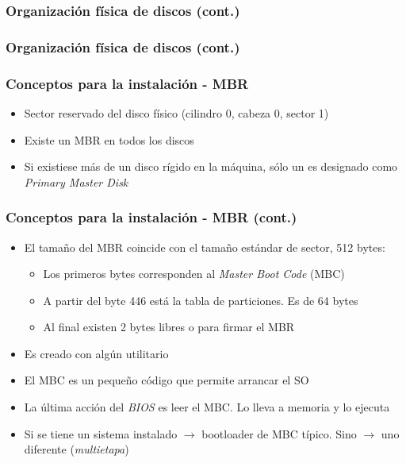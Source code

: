 \begin{frame}
	\frametitle{Organización física de discos (cont.)}
	\begin{figure}
	\end{figure}
\end{frame}

\begin{frame}
	\frametitle{Organización física de discos (cont.)}
	\begin{figure}
	\end{figure}
\end{frame}

\begin{frame}
	\frametitle{Conceptos para la instalación - \textbf{MBR}}
	\begin{itemize}
		\item Sector reservado del disco físico (cilindro 0, cabeza 0, sector 1)
		\item Existe un MBR en todos los discos
		\item Si existiese más de un disco rígido en la máquina, sólo un es designado como \textit{Primary Master Disk}
	\end{itemize}
\end{frame}

\begin{frame}
	\frametitle{Conceptos para la instalación - MBR (cont.)}
	\begin{itemize}
		\item El tamaño del MBR coincide con el tamaño estándar de sector, 512 bytes:
		\begin{itemize}
			\item Los primeros bytes corresponden al \textit{Master Boot Code} (MBC)
			\item A partir del byte 446 está la tabla de particiones. Es de 64 bytes
			\item Al final existen 2 bytes libres o para firmar el MBR
		\end{itemize}
		\item Es creado con algún utilitario	
		\item El MBC es un pequeño código que permite arrancar el SO
		\item La última acción del \textit{BIOS} es leer el MBC. Lo lleva a memoria y lo ejecuta		
		\item Si se tiene un sistema instalado $\rightarrow$ bootloader de MBC típico. Sino $\rightarrow$ uno diferente (\textit{multietapa})		
	\end{itemize}
\end{frame}

